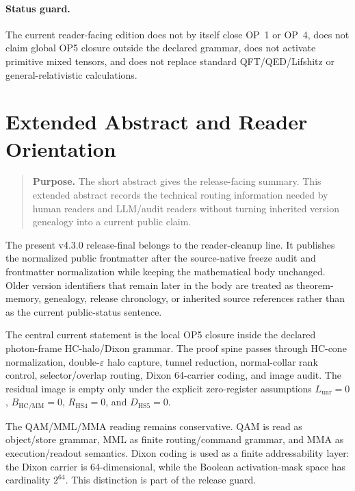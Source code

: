 \paragraph{Status guard.}
The current reader-facing edition does not by itself close OP~1 or OP~4, does not claim global OP5 closure outside the declared grammar, does not activate primitive mixed tensors, and does not replace standard QFT/QED/Lifshitz or general-relativistic calculations.

\clearpage



\section*{Extended Abstract and Reader Orientation}
\begin{quote}\small
\noindent\textbf{Purpose.} The short abstract gives the release-facing summary. This extended abstract records the technical routing information needed by human readers and LLM/audit readers without turning inherited version genealogy into a current public claim.
\end{quote}

The present v4.3.0 release-final belongs to the reader-cleanup line. It publishes the normalized public frontmatter after the source-native freeze audit and frontmatter normalization while keeping the mathematical body unchanged. Older version identifiers that remain later in the body are treated as theorem-memory, genealogy, release chronology, or inherited source references rather than as the current public-status sentence.

The central current statement is the local OP5 closure inside the declared photon-frame HC-halo/Dixon grammar. The proof spine passes through HC-cone normalization, double-\(\varepsilon\) halo capture, tunnel reduction, normal-collar rank control, selector/overlap routing, Dixon 64-carrier coding, and image audit. The residual image is empty only under the explicit zero-register assumptions \(L_{\mathrm{unr}}=0\), \(B_{\mathrm{HC/MM}}=0\), \(R_{\mathrm{HS4}}=0\), and \(D_{\mathrm{HS5}}=0\).

The QAM/MML/MMA reading remains conservative. QAM is read as object/store grammar, MML as finite routing/command grammar, and MMA as execution/readout semantics. Dixon coding is used as a finite addressability layer: the Dixon carrier is 64-dimensional, while the Boolean activation-mask space has cardinality \(2^{64}\). This distinction is part of the release guard.

